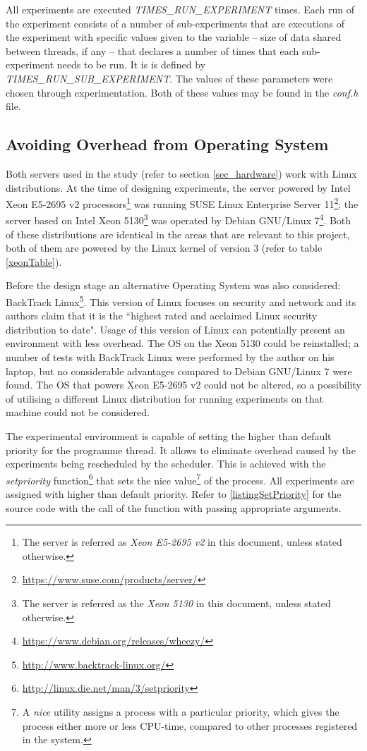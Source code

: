 All experiments are executed \textit{TIMES\_RUN\_EXPERIMENT} times. Each run of the experiment consists of a number of sub-experiments that are executions of the experiment with specific values given to the variable -- size of data shared between threads, if any -- that declares a number of times that each sub-experiment needs to be run. It is is defined by \textit{TIMES\_RUN\_SUB\_EXPERIMENT}. The values of these parameters were chosen through experimentation. Both of these values may be found in the \textit{conf.h} file.

\subsection{Avoiding Overhead from Operating System}
\label{OSinterference}

Both servers used in the study (refer to section \ref{sec_hardware}) work with Linux distributions. At the time of designing experiments, the server powered by Intel Xeon E5-2695 v2 processors\footnote{The server is referred as \textit{Xeon E5-2695 v2} in this document, unless stated otherwise.} was running SUSE Linux Enterprise Server 11\footnote{\url{https://www.suse.com/products/server/}}; the server based on Intel Xeon 5130\footnote{The server is referred as the \textit{Xeon 5130} in this document, unless stated otherwise.} was operated by Debian GNU/Linux 7\footnote{\url{https://www.debian.org/releases/wheezy/}}. Both of these distributions are identical in the areas that are relevant to this project, both of them are powered by the Linux kernel of version 3 (refer to table \ref{xeonTable}).

Before the design stage an alternative Operating System was also considered: BackTrack Linux\footnote{\url{http://www.backtrack-linux.org/}}. This version of Linux focuses on security and network and its authors claim that it is the ``highest rated and acclaimed Linux security distribution to date". Usage of this version of Linux can potentially present an environment with less overhead. The OS on the Xeon 5130 could be reinstalled; a number of tests with BackTrack Linux were performed by the author on his laptop, but no considerable advantages compared to Debian GNU/Linux 7 were found. The OS that powers Xeon E5-2695 v2 could not be altered, so a possibility of utilising a different Linux distribution for running experiments on that machine could not be considered.

The experimental environment is capable of setting the higher than default priority for the programme thread. It allows to eliminate overhead caused by the experiments being rescheduled by the scheduler. This is achieved with the \textit{setpriority} function\footnote{\url{http://linux.die.net/man/3/setpriority}} that sets the nice value\footnote{A \textit{nice} utility assigns a process with a particular priority, which gives the process either more or less CPU-time, compared to other processes registered in the system.} \cite{citeulike:200722} of the process. All experiments are assigned with higher than default priority. Refer to \ref{listingSetPriority} for the source code with the call of the function with passing appropriate arguments.

